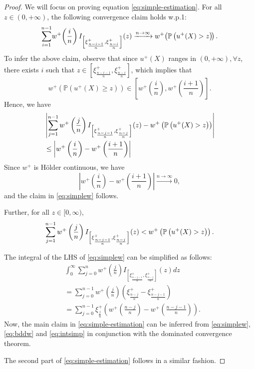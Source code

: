 \begin{proof}
We will focus on proving equation \eqref{eq:simple-estimation}. 
For all $z \in (0,+\infty)$, the following convergence claim holds w.p.1:  %
\begin{align}
\sum_{i=1}^{n-1}\! w^+\! \left(\frac{i}{n}\right) 
I_{\left[\xi^+_\frac{n-i-1}{n}, \xi^+_\frac{n-i}{n}\right]}(z) \xrightarrow{n \rightarrow\infty} w^+\!\left(\mathbb{P}\left( u^{+}(X)>z \right)\!\right).
\label{eq:simplew}
\end{align}
To infer the above claim, observe that since $u^+(X)$  
ranges in $(0,+\infty), \forall z$, there exists $i$ such that 
$z \in [\xi^+_{\frac{n-i-1}{n}}, \xi^+_{\frac{n-i}{n}}]$, which implies that 
$$w^+ \left( \mathbb{P} \left( u^+\left( X \right) \geq z \right)\right) \in \left[w^+\left(\frac{i}{n} \right), w^+\left( \frac{i+1}{n} \right)\right]. $$
Hence, we have 
\begin{align}
&\left| \sum_{j=1}^{n-1} w^+ \left(\frac{j}{n}\right) 
I_{\left[\xi^+_\frac{n-j-1}{n}, \xi^+_\frac{n-j}{n}\right]}(z) - w^+\left(\mathbb{P}\left( u^{+}(X)>z \right)\right)\right| \nonumber \\
&\leq  \left| w^+\left(\frac{i}{n} \right) - w^+\left( \frac{i+1}{n} \right) \right| \nonumber
\end{align}
Since $w^+$ is H\"{o}lder continuous, we have 
$$ \left | w^+\left(\frac{i}{n}\right)- w^+\left(\frac{i+1}{n}\right)\right| \xrightarrow{n \rightarrow \infty} 0,$$
and  the claim in \eqref{eq:simplew} follows.

Further, for all $z \in [0,\infty)$,
\begin{align}
\sum_{j=1}^{n-1} w^+ \left(\frac{j}{n}\right) 
I_{\left[\xi^+_\frac{n-j-1}{n}, \xi^+_\frac{n-j}{n}\right]}(z)
<
w^+\left(\mathbb{P}\left( u^{+}(X)>z \right)\right).\label{eq:bddw}
\end{align}

The integral of the LHS of \eqref{eq:simplew} can be simplified as follows:
\begin{align}
& \int_0^{\infty} \sum_{j=0}^{n} w^+ \left(\frac{j}{n}\right) 
 I_{\left[\xi^+_\frac{n-j-1}{n}, \xi^+_\frac{n-j}{n}\right]}(z) dz \nonumber\\
 & = \sum_{j=0}^{n-1} w^+\left(\frac{j}{n}\right) \left(\xi^+_{\frac{n-j}{n}} -
\xi^+_{\frac{n-j-1}{n}}\right) \nonumber\\ 
& = \sum_{j=0}^{n-1} \xi^+_{\frac{j}{n}} \left(w^+\left(\frac{n-j}{n}\right)-
    w^+\left(\frac{n-j-1}{n}\right)\right).\label{eq:intsimp}
\end{align}
Now, the main claim in \eqref{eq:simple-estimation} can be inferred from \eqref{eq:simplew},\eqref{eq:bddw} and \eqref{eq:intsimp} in conjunction with the dominated convergence theorem.

The second part of \eqref{eq:simple-estimation} follows in a similar fashion.
\end{proof} 


